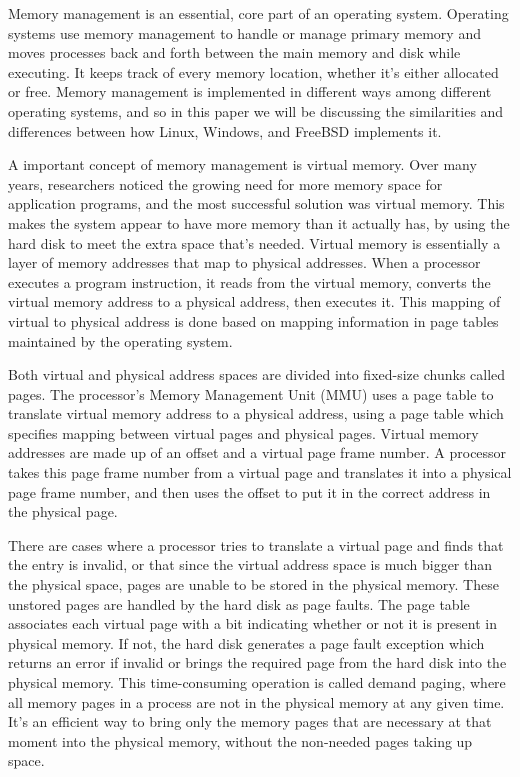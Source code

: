 \documentclass[10pt,draftclsnofoot,onecolumn,letterpaper]{IEEEtran}
\begin{document}
Memory management is an essential, core part of an operating system. Operating systems use memory management to handle or manage primary memory and moves processes back and forth between the main memory and disk while executing. It keeps track of every memory location, whether it's either allocated or free. Memory management is implemented in different ways among different operating systems, and so in this paper we will be discussing the similarities and differences between how Linux, Windows, and FreeBSD implements it. \par

A important concept of memory management is virtual memory. Over many years, researchers noticed the growing need for more memory space for application programs, and the most successful solution was virtual memory. This makes the system appear to have more memory than it actually has, by using the hard disk to meet the extra space that's needed. Virtual memory is essentially a layer of memory addresses that map to physical addresses\cite{16}. When a processor executes a program instruction, it reads from the virtual memory, converts the virtual memory address to a physical address, then executes it. This mapping of virtual to physical address is done based on mapping information in page tables maintained by the operating system\cite{14}. \par

\vspace{5mm}

Both virtual and physical address spaces are divided into fixed-size chunks called pages. The processor's Memory Management Unit (MMU) uses a page table to translate virtual memory address to a physical address, using a page table which specifies mapping between virtual pages and physical pages\cite{14}. Virtual memory addresses are made up of an offset and a virtual page frame number. A processor takes this page frame number from a virtual page and translates it into a physical page frame number, and then uses the offset to put it in the correct address in the physical page\cite{15}. \par
There are cases where a processor tries to translate a virtual page and finds that the entry is invalid, or that since the virtual address space is much bigger than the physical space, pages are unable to be stored in the physical memory. These unstored pages are handled by the hard disk as page faults\cite{15}. The page table associates each virtual page with a bit indicating whether or not it is present in physical memory. If not, the hard disk generates a page fault exception which returns an error if invalid or brings the required page from the hard disk into the physical memory. This time-consuming operation is called demand paging, where all memory pages in a process are not in the physical memory at any given time\cite{16}. It's an efficient way to bring only the memory pages that are necessary at that moment into the physical memory, without the non-needed pages taking up space. \par
\end{document}
